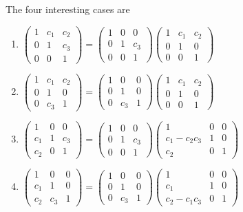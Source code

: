 The four interesting cases are
\begin{enumerate}
  \item $\begin{pmatrix} 1 & c_1 & c_2 \\0 & 1 & c_3 \\0 & 0 & 1 \end{pmatrix}
    = \begin{pmatrix} 1 & 0 & 0 \\0 & 1 & c_3 \\0 & 0 & 1 \end{pmatrix}
    \begin{pmatrix} 1 & c_1 & c_2 \\0 & 1 & 0 \\0 & 0 & 1 \end{pmatrix}$
  \item $\begin{pmatrix} 1 & c_1 & c_2 \\0 & 1 & 0 \\0 & c_3 & 1 \end{pmatrix}
    = \begin{pmatrix} 1 & 0 & 0 \\0 & 1 & 0 \\0 & c_3 & 1 \end{pmatrix}
    \begin{pmatrix} 1 & c_1 & c_2 \\0 & 1 & 0 \\0 & 0 & 1 \end{pmatrix}$
  \item $\begin{pmatrix} 1 & 0 & 0 \\c_1 & 1 & c_3 \\c_2 & 0 & 1 \end{pmatrix}
    = \begin{pmatrix} 1 & 0 & 0 \\0 & 1 & c_3 \\0 & 0 & 1 \end{pmatrix}
    \begin{pmatrix} 1 & 0 & 0 \\c_1 -c_2c_3& 1 & 0 \\c_2 & 0 & 1 \end{pmatrix}$
  \item $\begin{pmatrix} 1 & 0 & 0 \\c_1 & 1 & 0 \\c_2 & c_3 & 1 \end{pmatrix}
    = \begin{pmatrix} 1 & 0 & 0 \\0 & 1 & 0 \\0 & c_3 & 1 \end{pmatrix}
    \begin{pmatrix} 1 & 0 & 0 \\c_1 & 1 & 0 \\c_2-c_1c_3 & 0 & 1 \end{pmatrix}$
\end{enumerate}

